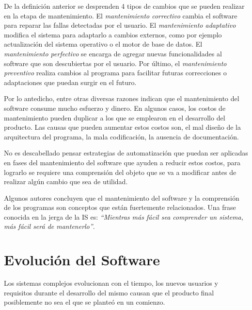 \documentclass[a4paper,12pt]{report}
\begin{document}
De la definición anterior se desprenden 4 tipos de cambios que se pueden realizar en la etapa de mantenimiento. El \textit{mantenimiento correctivo} cambia el software para reparar las fallas detectadas por el usuario. El \textit{mantenimiento adaptativo} modifica el sistema para adaptarlo a cambios externos, como por ejemplo actualización del sistema operativo o el motor de base de datos. El \textit{ mantenimiento perfectivo} se encarga de agregar nuevas funcionalidades al software que son descubiertas por el usuario. Por último, el \textit{mantenimiento preventivo} realiza cambios al programa para facilitar futuras correcciones o adaptaciones que puedan surgir en el futuro\cite{RSPMGH02}.


Por lo antedicho, entre otras diversas razones\cite{KBVR00} indican que el man\-tenimiento del software consume mucho esfuerzo y dinero. En algunos casos, los costos de mantenimiento pueden duplicar a los que se emplearon en el desarro\-llo del producto. Las causas que pueden aumentar estos costos son, el mal diseño de la arquitectura del programa, la mala codificación, la ausencia de documentación.

No es descabellado pensar estrategias de automatización que puedan ser aplicadas en fases del mantenimiento del software que ayuden a reducir estos costos, para lograrlo se requiere una comprensión del objeto que se va a modificar antes de realizar algún cambio que sea de utilidad.
 
Algunos autores\cite{KBVR00,MAS05,RSPMGH02,PFT02} concluyen que el mantenimiento del software y la comprensión de los programas son conceptos que están fuertemente relacionados. Una frase conocida en la jerga de la IS es: \textit{“Mientras más fácil sea comprender un sistema, más fácil será de mantenerlo”}.


\section{Evolución del Software}

Los sistemas complejos evolucionan con el tiempo, los nuevos usuarios y requisitos durante el desarrollo del mismo causan que el producto final posiblemente no sea el que se planteó en un comienzo. 
\end{document}
